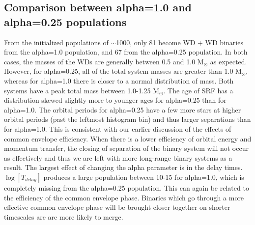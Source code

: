 \documentclass[12pt]{article}
\begin{document}
\pagebreak
\subsection{Comparison between alpha=1.0 and alpha=0.25 populations}
From the initialized populations of $\sim$1000, only 81 become WD + WD binaries from the alpha=1.0 population, and 67 from the alpha=0.25 population. In both cases, the masses of the WDs are generally between 0.5 and 1.0 M$_\odot$ as expected. However, for alpha=0.25, all of the total system masses are greater than 1.0 M$_\odot$, whereas for alpha=1.0 there is closer to a normal distribution of mass. Both systems have a peak total mass between 1.0-1.25 M$_\odot$. The age of SRF has a distribution skewed slightly more to younger ages for alpha=0.25 than for alpha=1.0. The orbital periods for alpha=0.25 have a few more stars at higher orbital periods (past the leftmost histogram bin) and thus larger separations than for alpha=1.0. This is consistent with our earlier discussion of the effects of common envelope efficiency. When there is a lower efficiency of orbital energy and momentum transfer, the closing of separation of the binary system will not occur as effectively and thus we are left with more long-range binary systems as a result. The largest effect of changing the alpha parameter is in the delay times. $\log[T_{delay}]$ produces a large population between 10-15 for alpha=1.0, which is completely missing from the alpha=0.25 population. This can again be related to the efficiency of the common envelope phase. Binaries which go through a more effective common envelope phase will be brought closer together on shorter timescales are are more likely to merge.
\end{document}
